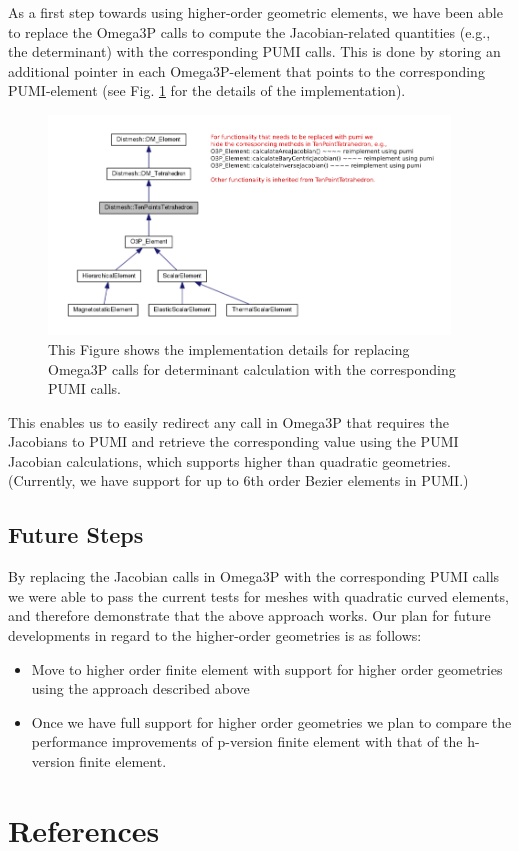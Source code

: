 \documentclass[review,12pt]{elsarticle_summary_report}
\begin{document}
As a first step towards using higher-order geometric elements, we have been able to replace the Omega3P calls to compute the Jacobian-related quantities (e.g., the determinant) with the corresponding PUMI calls. This is done by storing an additional pointer in each Omega3P-element that points to the corresponding  PUMI-element (see Fig. \ref{imp} for the details of the implementation).
\begin{figure}[ph!]
\centering
\includegraphics[width=0.95\textwidth]{hide_ten_point_tet.png}
\caption{\label{imp} This Figure shows the implementation details for replacing Omega3P calls for determinant calculation with the corresponding PUMI calls.}
\end{figure}
This enables us to easily redirect any call in Omega3P that requires the Jacobians to PUMI and retrieve the corresponding value using the PUMI Jacobian calculations, which supports higher than quadratic geometries. (Currently, we have support for up to 6th order Bezier elements in PUMI.)


\subsection{\label{high_order_geom_future} Future Steps}
By replacing the Jacobian calls in Omega3P with the corresponding PUMI calls we were able to pass the current tests for meshes with quadratic curved  elements, and therefore demonstrate that the above approach works. Our plan for future developments in regard to the higher-order geometries is as follows:

\begin{itemize}
  \item Move to higher order finite element with support for higher order geometries using the approach described above
  \item Once we have full support for higher order geometries we plan to compare the performance improvements of p-version finite element with that of the h-version finite element. 
\end{itemize}

\section*{References}
% 


\end{document}
